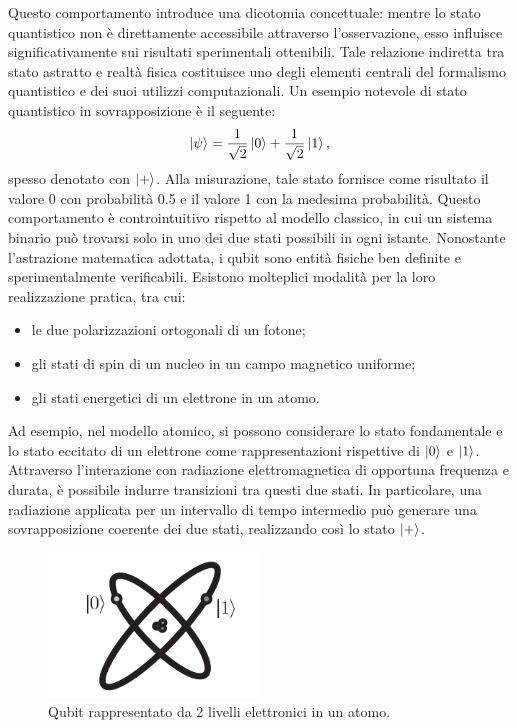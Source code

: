 \documentclass[a4paper,12pt]{report}
\theoremstyle{plain}
\begin{document}
Questo comportamento introduce una dicotomia concettuale: mentre lo stato quantistico non è direttamente accessibile attraverso l'osservazione, esso influisce significativamente sui risultati sperimentali ottenibili. Tale relazione indiretta tra stato astratto e realtà fisica costituisce uno degli elementi centrali del formalismo quantistico e dei suoi utilizzi computazionali.
Un esempio notevole di stato quantistico in sovrapposizione è il seguente:
\begin{equation*}
\ket{\psi} = \frac{1}{\sqrt{2}}\ket{0} + \frac{1}{\sqrt{2}}\ket{1},
\end{equation*}
spesso denotato con $\ket{+}$. Alla misurazione, tale stato fornisce come risultato il valore 0 con probabilità 0.5 e il valore 1 con la medesima probabilità. Questo comportamento è controintuitivo rispetto al modello classico, in cui un sistema binario può trovarsi solo in uno dei due stati possibili in ogni istante.
Nonostante l'astrazione matematica adottata, i qubit sono entità fisiche ben definite e sperimentalmente verificabili. Esistono molteplici modalità per la loro realizzazione pratica, tra cui:
\begin{itemize}[leftmargin=*]
\item le due polarizzazioni ortogonali di un fotone;
\item gli stati di spin di un nucleo in un campo magnetico uniforme;
\item gli stati energetici di un elettrone in un atomo.
\end{itemize}
Ad esempio, nel modello atomico, si possono considerare lo stato fondamentale e lo stato eccitato di un elettrone come rappresentazioni rispettive di $\ket{0}$ e $\ket{1}$. Attraverso l'interazione con radiazione elettromagnetica di opportuna frequenza e durata, è possibile indurre transizioni tra questi due stati. In particolare, una radiazione applicata per un intervallo di tempo intermedio può generare una sovrapposizione coerente dei due stati, realizzando così lo stato $\ket{+}$.
\begin{figure}[H]
    \centering
    \includegraphics[width=0.5\textwidth]{Immagine1.png} 
    \caption{Qubit rappresentato da 2 livelli elettronici in un atomo.}
    \label{Immagine1}
\end{figure}
\end{document}
